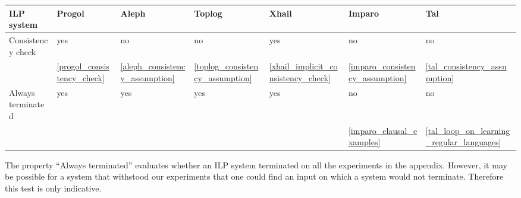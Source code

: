 \begin{center}
 \label{tab:title} 
\begin{tabular}{| l | l | l | l | l | l | l |}
    \hline
    ILP system & Progol & Aleph & Toplog & Xhail & Imparo & Tal \\ \hline
    Consistency check & yes & no & no & yes & no & no \\
	& \ref{progol_consistency_check}
	& \ref{aleph_consistency_assumption}
	& \ref{toplog_consistency_assumption}
	 & \ref{xhail_implicit_consistency_check}
	 & \ref{imparo_consistency_assumption}
	 & \ref{tal_consistency_assumption} \\ \hline
    Always terminated & yes & yes & yes & yes & no & no \\ 
	&  & & & & \ref{imparo_clausal_examples} & \ref{tal_loop_on_learning_regular_languages} \\ \hline
\end{tabular}
\end{center} 

The property ``Always terminated'' evaluates whether an ILP system terminated on all the experiments in the appendix. However, it may be possible for a system that withstood our experiments that one could find an input on which a system would not terminate. Therefore this test is only indicative.